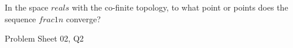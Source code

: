 \begin{samepage}
\begin{ex}
In the space $reals$ with the co-finite topology, to what point or points does the sequence $frac{1}{n}$ converge?
\end{ex}
\begin{source}
Problem Sheet 02, Q2
\end{source}
\end{samepage}
